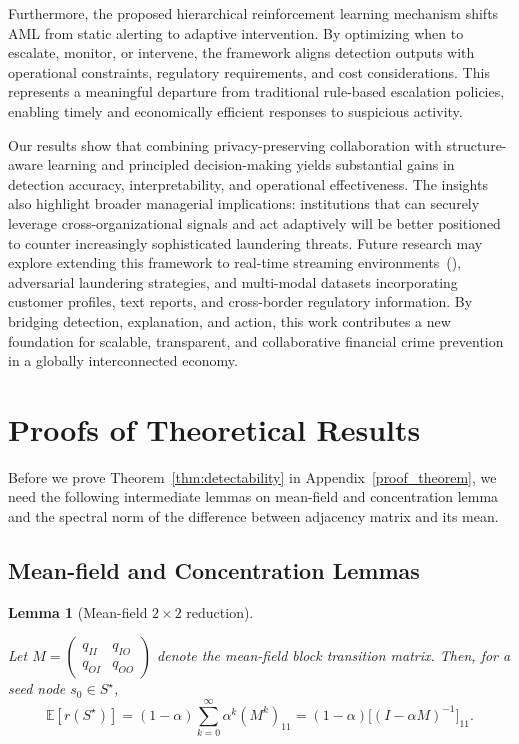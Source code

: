 \documentclass[11pt,english]{article}
\newtheorem{lemma}{Lemma}
\begin{document}
Furthermore, the proposed hierarchical reinforcement learning mechanism shifts AML from static alerting to adaptive intervention. By optimizing when to escalate, monitor, or intervene, the framework aligns detection outputs with operational constraints, regulatory requirements, and cost considerations. This represents a meaningful departure from traditional rule-based escalation policies, enabling timely and economically efficient responses to suspicious activity.

Our results show that combining privacy-preserving collaboration with structure-aware learning and principled decision-making yields substantial gains in detection accuracy, interpretability, and operational effectiveness. The insights also highlight broader managerial implications: institutions that can securely leverage cross-organizational signals and act adaptively will be better positioned to counter increasingly sophisticated laundering threats. Future research may explore extending this framework to real-time streaming environments~(\cite{zheng2024online, zheng2024mulan}), adversarial laundering strategies, and multi-modal datasets incorporating customer profiles, text reports, and cross-border regulatory information. By bridging detection, explanation, and action, this work contributes a new foundation for scalable, transparent, and collaborative financial crime prevention in a globally interconnected economy.



\printbibliography


\appendix
\section{Proofs of Theoretical Results}
\label{app:proofs}
Before we prove Theorem~\ref{thm:detectability} in Appendix~\ref{proof_theorem}, we need the following intermediate lemmas on mean-field and concentration lemma and the spectral norm of the difference between adjacency matrix and its mean.

\subsection{Mean-field and Concentration Lemmas}

\begin{lemma}[Mean-field $2\times 2$ reduction]
\label{lem:meanfield}

Let $M=\begin{pmatrix} q_{II} & q_{IO}\\ q_{OI} & q_{OO}\end{pmatrix}$ denote the mean-field block transition matrix.
Then, for a seed node $s_0\in S^\star$,
\[
\mathbb{E}[r(S^\star)] = (1-\alpha)\sum_{k=0}^\infty \alpha^k (M^k)_{11}
= (1-\alpha)\big[(I-\alpha M)^{-1}\big]_{11}.
\]
\end{lemma}
\end{document}
